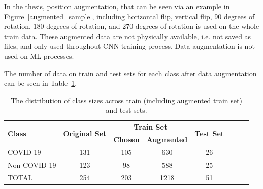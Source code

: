 In the thesis,  position augmentation, that can be seen via an example in Figure~\ref{augmented_sample}, including horizontal flip,  vertical flip,  90 degrees of rotation, 180 degrees of rotation, and 270 degrees of rotation is used on the whole train data. These augmented data are not physically available, i.e. not saved as files, and only used throughout CNN training process. Data augmentation is not used on ML processes.

The number of data on train and test sets for each class after data augmentation can be seen in Table~\ref{tab:final_dataset_size}.

\begin{table}[h]
{
    \setlength{\tabcolsep}{14pt}
    \caption{The distribution of class sizes across train (including augmented train set) and test sets.}
    \begin{center}
    \begin{tabular}{lccrrrrr}
    \hline
    \multirow{2}{*}{\textbf{Class}} & \multirow{2}{*}{\textbf{Original Set}} & \multicolumn{2}{c}{\textbf{Train Set}} & \multirow{2}{*}{\textbf{Test Set}} \\ \cline{3-4}
                           &                               & \textbf{Chosen}  & \textbf{Augmented}  &    \\
    \hline \hline
    COVID-19           & 131                           & 105     & \multicolumn{1}{c}{630} & \multicolumn{1}{c}{26} \\
    Non-COVID-19               & 123                           & 98      & \multicolumn{1}{c}{588} & \multicolumn{1}{c}{25} \\
    TOTAL                  & 254                           & 203     & \multicolumn{1}{c}{1218} & \multicolumn{1}{c}{51} \\   
    \hline
    \end{tabular}
    \end{center}
    \label{tab:final_dataset_size}
}
\end{table}

